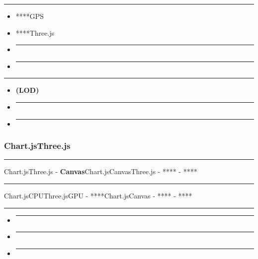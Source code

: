 \begin{center}\rule{0.5\linewidth}{0.5pt}\end{center}

\begin{itemize}
\item
  ****GPS
\item
  ****Three.js
\item
  \begin{center}\rule{0.5\linewidth}{0.5pt}\end{center}
\item
  \begin{center}\rule{0.5\linewidth}{0.5pt}\end{center}
\end{itemize}

\begin{center}\rule{0.5\linewidth}{0.5pt}\end{center}

\begin{itemize}
\item
  \textbf{(LOD)}
\item
  \begin{center}\rule{0.5\linewidth}{0.5pt}\end{center}
\item
  \begin{center}\rule{0.5\linewidth}{0.5pt}\end{center}
\end{itemize}

\subsubsection{Chart.jsThree.js}\label{chart.jsthree.js}

\begin{center}\rule{0.5\linewidth}{0.5pt}\end{center}

Chart.jsThree.js - \textbf{Canvas}Chart.jsCanvasThree.js - **** - ****

\begin{center}\rule{0.5\linewidth}{0.5pt}\end{center}

Chart.jsCPUThree.jsGPU - ****Chart.jsCanvas - **** - ****

\begin{center}\rule{0.5\linewidth}{0.5pt}\end{center}

\begin{itemize}
\item
  \begin{center}\rule{0.5\linewidth}{0.5pt}\end{center}
\item
  \begin{center}\rule{0.5\linewidth}{0.5pt}\end{center}
\item
  \begin{center}\rule{0.5\linewidth}{0.5pt}\end{center}
\end{itemize}

